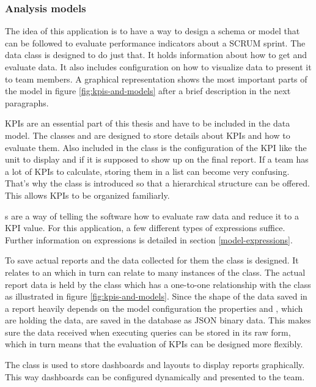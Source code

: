 \subsubsection{Analysis models}

The idea of this application is to have a way to design a schema or model that can be followed to evaluate performance indicators about a SCRUM sprint. 
The  data class is designed to do just that. 
It holds information about how to get and evaluate data. 
It also includes configuration on how to visualize data to present it to team members. 
A graphical representation shows the most important parts of the model in figure \ref{fig:kpis-and-models} after a brief description in the next paragraphs.

KPIs are an essential part of this thesis and have to be included in the data model. 
The classes  and  are designed to store details about KPIs and how to evaluate them. 
Also included in the  class is the configuration of the KPI like the unit to display and if it is supposed to show up on the final report. 
If a team has a lot of KPIs to calculate, storing them in a list can become very confusing. 
That's why the class  is introduced so that a hierarchical structure can be offered. 
This allows KPIs to be organized familiarly.

s are a way of telling the software how to evaluate raw data and reduce it to a KPI value. 
For this application, a few different types of expressions suffice. 
Further information on expressions is detailed in section \ref{model-expressions}.

To save actual reports and the data collected for them the  class is designed. 
It relates to an  which in turn can relate to many instances of the  class. 
The actual report data is held by the class  which has a one-to-one relationship with the  class as illustrated in figure \ref{fig:kpis-and-models}. 
Since the shape of the data saved in a report heavily depends on the model configuration the properties  and , 
which are holding the data, are saved in the database as JSON binary data. 
This makes sure the data received when executing queries can be stored in its raw form, which in turn means that the evaluation of KPIs can be designed more flexibly. 

The class  is used to store dashboards and layouts to display reports graphically. 
This way dashboards can be configured dynamically and presented to the team.

